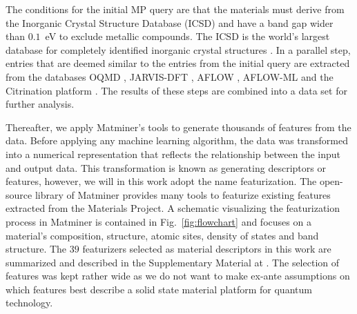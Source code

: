 \documentclass[superscriptaddress,unsortedaddress,
 amsmath,amssymb,
 aps,
]{revtex4-2}
\begin{document}
The conditions for the initial MP query are that the materials must derive from 
the Inorganic Crystal Structure Database (ICSD) and have a band gap wider than $0.1$~eV to exclude metallic compounds. The ICSD is the world's largest database for completely identified inorganic crystal structures \cite{Allen1987,Zagorac2019}. 
In a parallel step, entries that are deemed similar to the entries from the initial query are extracted from the databases OQMD \cite{Saal2013,Kirklin2015}, JARVIS-DFT \cite{Choudhary2020}, AFLOW \cite{Curtarolo2012, Curtarolo2012a, Calderon2015}, AFLOW-ML \cite{Isayev2017} and the Citrination platform \cite{OMaraJordan2016MDIA}. The results of these steps are combined into a data set for further analysis. 

Thereafter, we apply Matminer’s \cite{Ward2018} tools to generate thousands of features from the data. 
Before applying any machine learning algorithm, the data was transformed into a numerical representation that reflects the relationship between the input and output data. This transformation is known as generating descriptors 
or features, however, we will in this work adopt the name featurization. 
The open-source library of Matminer provides many tools to featurize existing features extracted from the Materials Project. 
A schematic visualizing the featurization process in Matminer is contained in Fig.~\ref{fig:flowchart} 
and focuses on a material's composition,  structure, atomic sites, density of states and band structure. 
The $39$ featurizers selected as material descriptors in this work are summarized and described in the Supplementary Material at \cite{supplementary}. The selection of features was kept rather wide as we do not want to make ex-ante assumptions on which features best describe a solid state material platform for quantum technology. 
\end{document}

